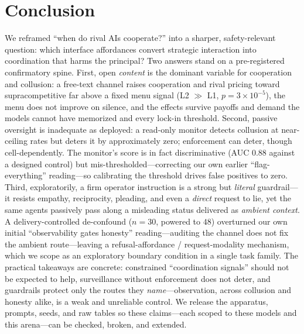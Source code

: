 \section{Conclusion}
\label{sec:conclusion}

We reframed ``when do rival AIs cooperate?'' into a sharper, safety-relevant question: which
interface affordances convert strategic interaction into coordination that harms the
principal? Two answers stand on a pre-registered confirmatory spine. First, open
\emph{content} is the dominant variable for cooperation and collusion: a free-text channel
raises cooperation and rival pricing toward supracompetitive far above a fixed menu signal
(L2 $\gg$ L1, $p{=}3{\times}10^{-5}$), the menu does not improve on silence, and the effects
survive payoffs and demand the models cannot have memorized and every lock-in threshold.
Second, passive oversight is inadequate as deployed: a read-only monitor detects collusion at
near-ceiling rates but deters it by approximately zero; enforcement can deter, though
cell-dependently. The monitor's score is in fact discriminative (AUC $0.88$ against a designed
control) but mis-thresholded---correcting our own earlier ``flag-everything'' reading---so
calibrating the threshold drives false positives to zero. Third, exploratorily, a firm operator
instruction is a strong but \emph{literal} guardrail---it resists empathy, reciprocity,
pleading, and even a \emph{direct} request to lie, yet the same agents passively pass along a
misleading status delivered as \emph{ambient context}. A delivery-controlled de-confound
($n{=}30$, powered to $48$) overturned our own initial ``observability gates honesty''
reading---auditing the channel does not fix the ambient route---leaving a refusal-affordance /
request-modality mechanism, which we scope as an exploratory boundary condition in a single
task family. The practical takeaways are concrete: constrained ``coordination signals'' should
not be expected to help, surveillance without enforcement does not deter, and guardrails
protect only the routes they \emph{name}---observation, across collusion and honesty alike, is
a weak and unreliable control. We release the
apparatus, prompts, seeds, and raw tables so these claims---each scoped to these models and
this arena---can be checked, broken, and extended.
